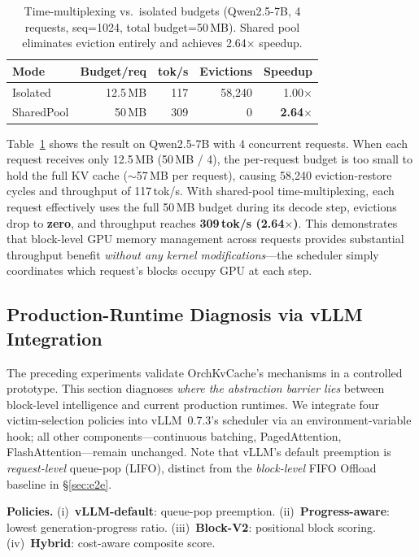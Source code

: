 \documentclass[conference]{IEEEtran}
\begin{document}
\begin{table}[t]
\centering
\caption{Time-multiplexing vs.\ isolated budgets (Qwen2.5-7B, 4 requests, seq=1024, total budget=50\,MB). Shared pool eliminates eviction entirely and achieves 2.64$\times$ speedup.}
\label{tab:time-multiplex}
\small
\setlength{\tabcolsep}{6pt}
\begin{tabular}{@{}lrrrr@{}}
\toprule
Mode & Budget/req & tok/s & Evictions & Speedup \\
\midrule
Isolated    & 12.5\,MB & 117 & 58{,}240 & 1.00$\times$ \\
SharedPool  & 50\,MB   & 309 & 0        & \textbf{2.64$\times$} \\
\bottomrule
\end{tabular}
\end{table}

Table~\ref{tab:time-multiplex} shows the result on Qwen2.5-7B with 4 concurrent requests. When each request receives only 12.5\,MB (50\,MB / 4), the per-request budget is too small to hold the full KV cache (${\sim}$57\,MB per request), causing 58{,}240 eviction-restore cycles and throughput of 117\,tok/s. With shared-pool time-multiplexing, each request effectively uses the full 50\,MB budget during its decode step, evictions drop to \textbf{zero}, and throughput reaches \textbf{309\,tok/s (2.64$\times$)}. This demonstrates that block-level GPU memory management across requests provides substantial throughput benefit \emph{without any kernel modifications}---the scheduler simply coordinates which request's blocks occupy GPU at each step.

\subsection{Production-Runtime Diagnosis via vLLM Integration}
\label{sec:vllm-integration}

The preceding experiments validate OrchKvCache's mechanisms in a controlled prototype. This section diagnoses \emph{where the abstraction barrier lies} between block-level intelligence and current production runtimes. We integrate four victim-selection policies into vLLM~0.7.3's scheduler via an environment-variable hook; all other components---continuous batching, PagedAttention, FlashAttention---remain unchanged. Note that vLLM's default preemption is \emph{request-level} queue-pop (LIFO), distinct from the \emph{block-level} FIFO Offload baseline in \S\ref{sec:e2e}.

\textbf{Policies.} (i)~\textbf{vLLM-default}: queue-pop preemption. (ii)~\textbf{Progress-aware}: lowest generation-progress ratio. (iii)~\textbf{Block-V2}: positional block scoring. (iv)~\textbf{Hybrid}: cost-aware composite score.
\end{document}
